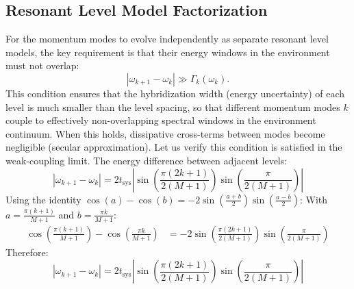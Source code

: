 \documentclass[12pt,oneside,openright]{report}
\theoremstyle{definition}
\theoremstyle{plain}
\theoremstyle{remark}
\begin{document}
\subsection{Resonant Level Model Factorization}
\label{subsec:rlm_factorization}
For the momentum modes to evolve independently as separate resonant level models, the key requirement is 
that their energy windows in the environment must not overlap:
\begin{equation}
    |\omega_{k+1} - \omega_k| \gg \Gamma_k(\omega_k).
\label{eq:rlm_condition}
\end{equation}
This condition ensures that the hybridization width (energy uncertainty) of each level is much smaller than 
the level spacing, so that different momentum modes $k$ couple to effectively non-overlapping spectral 
windows in the environment continuum. When this holds, dissipative cross-terms between modes become 
negligible (secular approximation).
Let us verify this condition is satisfied in the weak-coupling limit.
The energy difference between adjacent levels:
\begin{equation}
|\omega_{k+1} - \omega_k| = 2t_{\text{sys}}\left|\sin\left(\frac{\pi(2k+1)}{2(M+1)}\right)\sin\left(\frac{\pi}{2(M+1)}\right)\right|
\end{equation}
Using the identity $\cos(a) - \cos(b) = -2\sin\left(\frac{a+b}{2}\right)\sin\left(\frac{a-b}{2}\right)$:
With $a = \frac{\pi(k+1)}{M+1}$ and $b = \frac{\pi k}{M+1}$:
\begin{align}
\cos\left(\frac{\pi(k+1)}{M+1}\right) - \cos\left(\frac{\pi k}{M+1}\right) &= -2\sin\left(\frac{\pi(2k+1)}{2(M+1)}\right)\sin\left(\frac{\pi}{2(M+1)}\right)
\end{align}
Therefore:
\begin{equation}
|\omega_{k+1} - \omega_k| = 2t_{\text{sys}}\left|\sin\left(\frac{\pi(2k+1)}{2(M+1)}\right)\sin\left(\frac{\pi}{2(M+1)}\right)\right|
\end{equation}
\end{document}
